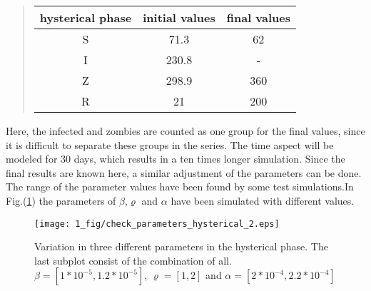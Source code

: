 \documentclass[%
twoside,                 %
final,                   %
chapterprefix=true,      %
open=right               %
10pt]{book}
\begin{document}
\begin{quote}
\begin{tabular}{ccc}
\hline
\multicolumn{1}{c}{ hysterical phase } & \multicolumn{1}{c}{ initial values } & \multicolumn{1}{c}{ final values } \\
\hline
S                & 71.3             & 62               \\
I                & 230.8            & -                \\
Z                & 298.9            & 360              \\
R                & 21               & 200              \\
\hline
\end{tabular}
\end{quote}

\noindent
Here, the infected and zombies are counted as one group for the final values, since it is difficult to separate these groups in the series. The time aspect will be modeled for 30 days, which results in a ten times longer simulation. Since the final results are known here, a similar adjustment of the parameters can be done. The range of the parameter values have been found by some test simulations.In Fig.(\ref{fig:hysterical_variations}) the parameters of $\beta$,$\varrho$ and $\alpha$ have been simulated with different values. 


\begin{figure}[ht]
  \centerline{\texttt{[image: 1\_fig/check\_parameters\_hysterical\_2.eps]}}
  \caption{
  \label{fig:hysterical_variations} Variation in three different parameters in the hysterical phase. The last subplot consist of the combination of all. $\beta=[1*10^{-5},1.2*10^{-5}]$, $\varrho=[1,2]$ and $\alpha=[2*10^{-4},2.2*10^{-4}]$
  }
\end{figure}
\end{document}
